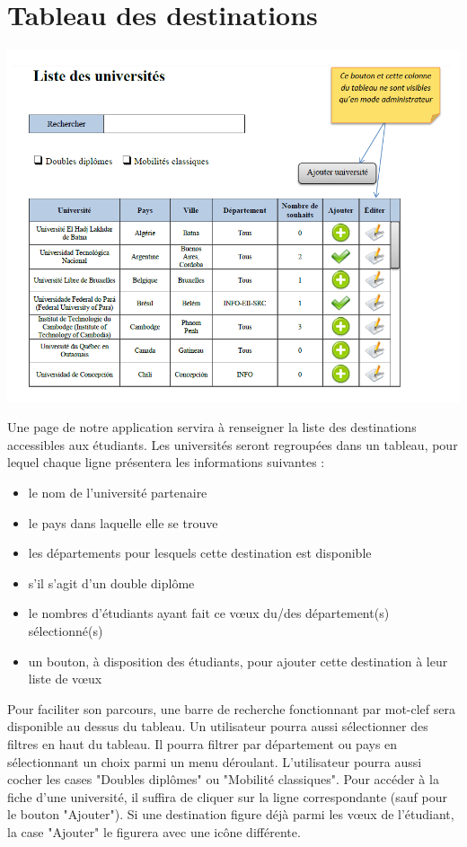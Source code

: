 \section{Tableau des destinations}
\includegraphics[scale=0.7]{Universites/listeUnivs.png}


Une page de notre application servira à renseigner la liste des destinations accessibles aux étudiants.
Les universités seront regroupées dans un tableau, pour lequel chaque ligne présentera les informations suivantes :
 \begin{itemize}
 	\item le nom de l'université partenaire
 	\item le pays dans laquelle elle se trouve
 	\item les départements pour lesquels cette destination est disponible
 	\item s'il s'agit d'un double diplôme
 	\item le nombres d'étudiants ayant fait ce vœux du/des département(s) sélectionné(s)
 	\item un bouton, à disposition des étudiants, pour ajouter cette destination à leur liste de vœux

 \end{itemize}
 
  Pour faciliter son parcours, une barre de recherche fonctionnant par mot-clef sera disponible au dessus du tableau. Un utilisateur pourra aussi sélectionner des filtres en haut du tableau. Il pourra filtrer par département ou pays en sélectionnant un choix parmi un menu déroulant. L'utilisateur pourra aussi cocher les cases "Doubles diplômes" ou "Mobilité classiques". Pour accéder à la fiche d'une université, il suffira de cliquer sur la ligne correspondante (sauf pour le bouton "Ajouter"). Si une destination figure déjà parmi les vœux de l'étudiant, la case "Ajouter" le figurera avec une icône différente.
  
